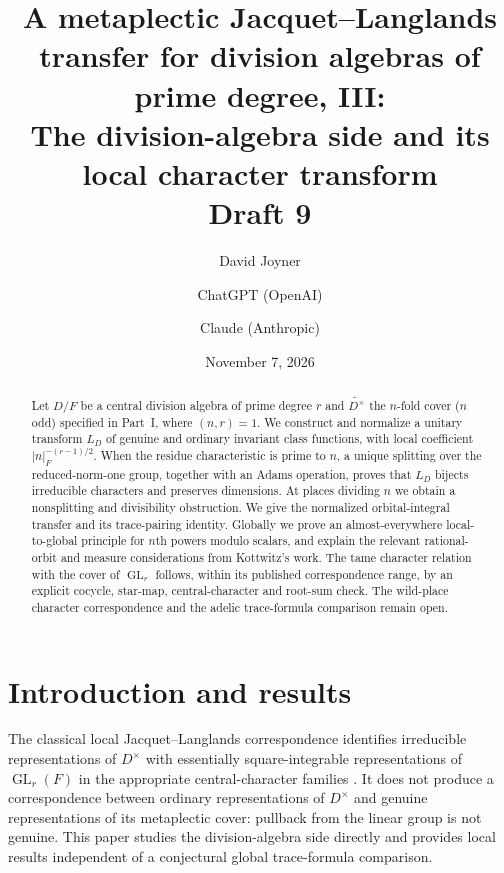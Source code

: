 \documentclass[11pt]{article}
\title{A metaplectic Jacquet--Langlands transfer for division algebras of prime degree, III:\\
The division-algebra side and its local character transform\\[0.4em]\normalsize Draft 9}
\author{David Joyner \and ChatGPT (OpenAI) \and Claude (Anthropic)}
\date{November 7, 2026}
\newcommand{\GL}{\operatorname{GL}}
\theoremstyle{plain}
\theoremstyle{definition}
\begin{document}
\maketitle
\begin{abstract}
Let $D/F$ be a central division algebra of prime degree $r$ and
$\widetilde{D^\times}$ the $n$-fold cover ($n$ odd) specified in
Part~I, where $(n,r)=1$. We construct and normalize a unitary
transform $L_D$ of genuine and ordinary invariant class functions,
with local coefficient $|n|_F^{-(r-1)/2}$. When the residue characteristic
is prime to $n$, a unique splitting over the reduced-norm-one group,
together with an Adams operation, proves that $L_D$ bijects irreducible
characters and preserves dimensions. At places dividing $n$ we obtain
a nonsplitting and divisibility obstruction. We give the normalized
orbital-integral transfer and its trace-pairing identity. Globally we
prove an almost-everywhere local-to-global principle for $n$th powers
modulo scalars, and explain the relevant rational-orbit and measure
considerations from Kottwitz's work. The tame character relation with the cover of $\GL_r$ follows, within
its published correspondence range, by an explicit cocycle, star-map,
central-character and root-sum check. The wild-place character
correspondence and the adelic trace-formula comparison remain open.
\end{abstract}
\tableofcontents

\section{Introduction and results}
The classical local Jacquet--Langlands correspondence identifies
irreducible representations of $D^\times$ with essentially
square-integrable representations of $\GL_r(F)$ in the appropriate
central-character families \cite{DKV}. It does not produce a
correspondence between ordinary representations of $D^\times$ and
genuine representations of its metaplectic cover: pullback from the
linear group is not genuine. This paper studies the division-algebra
side directly and provides local results independent of a conjectural
global trace-formula comparison.
\end{document}
